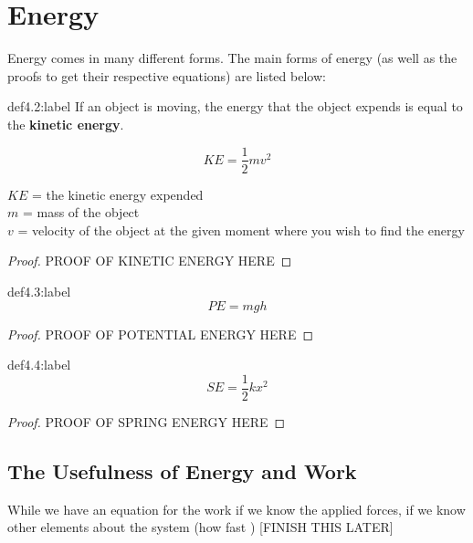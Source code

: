 \section{Energy}

Energy comes in many different forms. The main forms of energy (as well as the proofs to get their respective equations) are listed below:


\begin{definition}{def4.2:label}
    If an object is moving, the energy that the object expends is equal to the \textbf{kinetic energy}. 

    $$
    KE = \frac{1}{2}mv^2
    $$

    $KE$ = the kinetic energy expended\\
    $m$ = mass of the object\\
    $v$ = velocity of the object at the given moment where you wish to find the energy
\end{definition}

\begin{proof}
    PROOF OF KINETIC ENERGY HERE
\end{proof}


\begin{definition}{def4.3:label}
    $$
    PE = mgh
    $$
\end{definition}

\begin{proof}
    PROOF OF POTENTIAL ENERGY HERE
\end{proof}

\begin{definition}{def4.4:label}
    $$
    SE = \frac{1}{2}kx^2
    $$
\end{definition}

\begin{proof}
    PROOF OF SPRING ENERGY HERE
\end{proof}

\subsection{The Usefulness of Energy and Work}

While we have an equation for the work if we know the applied forces, if we know other elements about the system (how fast ) [FINISH THIS LATER]


